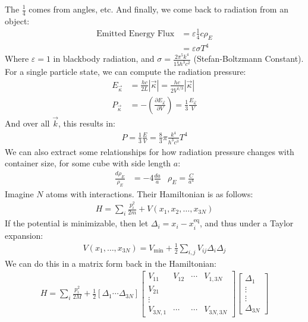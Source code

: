 \documentclass{article}
\begin{document}
The $\frac{1}{4}$ comes from angles, etc.
\gap
And finally, we come back to radiation from an object:
\begin{align*}
  \text{Emitted Energy Flux} &= \varepsilon \frac{1}{4} c \rho_E\\
  &= \varepsilon \sigma T^4
\end{align*}
Where $\varepsilon = 1$ in blackbody radiation, and $\sigma = \frac{2\pi^5k^4}{15h^3c^2}$ (Stefan-Boltzmann Constant).
\gap
{} For a single particle state, we can compute the radiation pressure:
\begin{align*}
  E_{\vec{\kappa}} &= \frac{hc}{2L}|\vec{\kappa}| = \frac{hc}{2V^{1/3}}|\vec{\kappa}|\\
  P_{\vec{\kappa}} &= - \left(\frac{\partial E_{\vec{\kappa}}}{\partial V}\right) = \frac{1}{3}\frac{E_{\vec{\kappa}}}{V}
\end{align*}
And over all $\vec{k}$, this results in:
\begin{align*}
  P = \frac{1}{3}\frac{E}{V} = \frac{8}{3}\pi \frac{k^4}{h^3c^3}T^4
\end{align*}
We can also extract some relationships for how radiation pressure changes with container size, for some cube with side length $a$:
\begin{align*}
  \frac{d\rho_E}{\rho_E} &= -4 \frac{da}{a} & \rho_E = \frac{C}{a^4}
\end{align*}
\vfill\pagebreak
{}
Imagine $N$ atoms with interactions. Their Hamiltonian is as follows:
\begin{align*}
  H = \sum_{i} \frac{p_i^2}{2m} + V(x_1, x_2, \ldots, x_{3N})
\end{align*}
If the potential is minimizable, then let $\Delta_i = x_i - x_i^{\text{eq}}$, and thus under a Taylor expansion:
\begin{align*}
  V(x_1, \ldots, x_{3N}) = V_\text{min} + \frac{1}{2}\sum_{i, j} V_{ij}\Delta_i \Delta_j
\end{align*}
We can do this in a matrix form back in the Hamiltonian:
\begin{align*}
  H = \sum_i \frac{p_i^2}{2M} + \frac{1}{2}[\Delta_1 \cdots \Delta_{3N}] \begin{bmatrix}
    V_{11} & V_{12} & \cdots & V_{1, 3N}\\
    V_{21} & &\\
    \vdots & & \\
    V_{3N, 1} & \cdots & \cdots & V_{3N, 3N}
  \end{bmatrix}
  \begin{bmatrix}
    \Delta_1\\
    \vdots\\
    \vdots\\
    \Delta_{3N}
  \end{bmatrix}
\end{align*}
\end{document}
